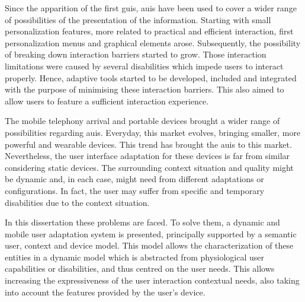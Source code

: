 




\begin{abstracts}        %
Since the apparition of the first \acp{gui}, \acp{aui} have been used to cover
a wider range of possibilities of the presentation of the information. Starting 
with small personalization features, more related to practical and efficient 
interaction, first personalization menus and graphical elements arose. 
Subsequently, the possibility of breaking down interaction barriers started to
grow. Those interaction limitations were caused by several disabilities which
impede users to interact properly. Hence, adaptive tools started to be developed,
included and integrated with the purpose of minimising these interaction barriers.
This also aimed to allow users to feature a sufficient interaction experience.

The mobile telephony arrival and portable devices brought a wider range of
possibilities regarding \acp{aui}. Everyday, this market evolves, bringing
smaller, more powerful and wearable devices. This trend has brought the \acp{aui}
to this market. Nevertheless, the user interface adaptation for these devices
is far from similar considering static devices. The surrounding context situation 
and quality might be dynamic and, in each case, might need from different
adaptations or configurations. In fact, the user may suffer from specific and
temporary disabilities due to the context situation.

In this dissertation these problems are faced. To solve them, a dynamic and mobile
user adaptation system is presented, principally supported by a semantic user,
context and device model. This model allows the characterization of these entities
in a dynamic model which is abstracted from physiological user capabilities or
disabilities, and thus centred on the user needs. This allows increasing the
expressiveness of the user interaction contextual needs, also taking into account
the features provided by the user's device.


\end{abstracts}

